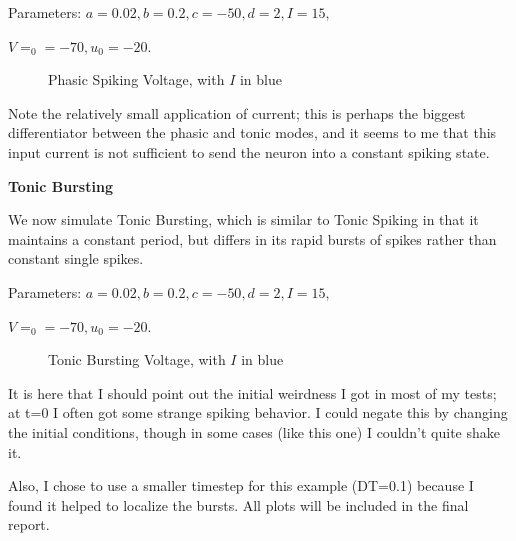 \documentclass[a4paper,12pt]{article}
\begin{document}
\vspace{2mm}

Parameters: $a=0.02, b=0.2, c=-50, d=2, I=15, $

\vspace{1mm}

$V=_{0}=-70, u_{0}=-20$. 

\begin{figure}[h!]
\begin{center}
\end{center}
\caption{\label{pict2}Phasic Spiking Voltage, with $I$ in blue}
\end{figure}

Note the relatively small application of current; this is perhaps the biggest differentiator between the phasic and tonic modes, and it seems to me that this input current is not sufficient to send the neuron into a constant spiking state. 

\vfil\eject


{\bf Tonic Bursting}
\bigskip

We now simulate Tonic Bursting, which is similar to Tonic Spiking in that it maintains a constant period, but differs in its rapid bursts of spikes rather than constant single spikes.

\vspace{2mm}

Parameters: $a=0.02, b=0.2, c=-50, d=2, I=15, $

\vspace{1mm}

$V=_{0}=-70, u_{0}=-20$. 

\begin{figure}[h!]
\begin{center}
\end{center}
\caption{\label{pict3}Tonic Bursting Voltage, with $I$ in blue}
\end{figure}

It is here that I should point out the initial weirdness I got in most of my tests; at t=0 I often got some strange spiking behavior. I could negate this by changing the initial conditions, though in some cases (like this one) I couldn't quite shake it. 

\vspace{2mm}

Also, I chose to use a smaller timestep for this example (DT=0.1) because I found it helped to localize the bursts. All plots will be included in the final report. 
\end{document}

